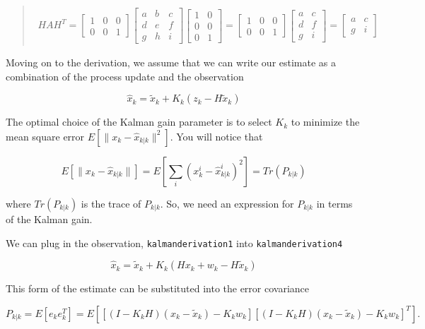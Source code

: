 \begin{quote}
\[\begin{aligned}
H A H^T = \begin{bmatrix} 1 & 0 & 0 \\ 0 & 0 &1 \end{bmatrix}
\begin{bmatrix} a & b & c \\ d & e & f\\ g & h &i \end{bmatrix}
\begin{bmatrix} 1 & 0 \\ 0 & 0  \\ 0 & 1 \end{bmatrix}
=
\begin{bmatrix} 1 & 0 & 0 \\ 0 & 0 &1 \end{bmatrix}
\begin{bmatrix} a & c \\ d  & f\\ g &i \end{bmatrix}
=
\begin{bmatrix} a & c \\ g &i \end{bmatrix}
\end{aligned}\]
\end{quote}

Moving on to the derivation, we assume that we can write our estimate as
a combination of the process update and the observation

\[\hat{x}_k = \tilde{x}_k + K_k (z_k - H\tilde{x}_k)\]

The optimal choice of the Kalman gain parameter is to select \(K_k\) to
minimize the mean square error \(E[ \| x_k - \hat{x}_{k|k} \|^2 ]\). You
will notice that

\[E[ \| x_k - \hat{x}_{k|k} \| ] = E \left[ \sum_i (x^i_{k}- \hat{x}^i_{k|k})^2\right]
 = Tr(P_{k|k})\]

where \(Tr(P_{k|k})\) is the trace of \(P_{k|k}\). So, we need an
expression for \(P_{k|k}\) in terms of the Kalman gain.

We can plug in the observation, \texttt{kalmanderivation1} into
\texttt{kalmanderivation4}

\[\hat{x}_k = \tilde{x}_k + K_k (Hx_k + w_k - H\tilde{x}_k)\]

This form of the estimate can be substituted into the error covariance

\[P_{k|k} = E[e_ke_k^T] = E[[(I - K_kH)(x_k-\tilde{x}_k)-K_kw_k][(I - K_kH)(x_k-\tilde{x}_k)-K_kw_k]^T] .\]

